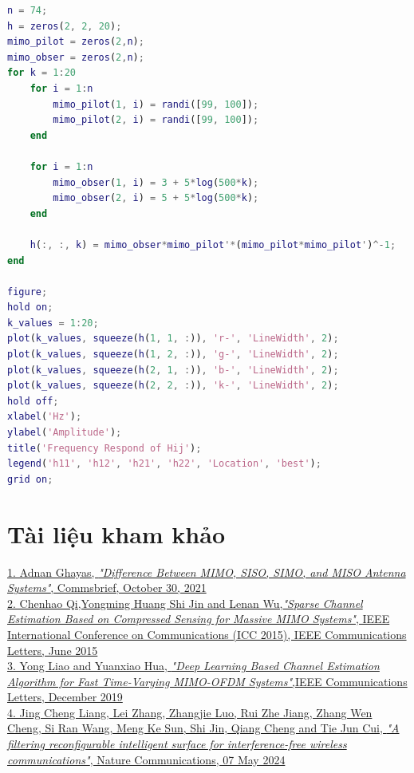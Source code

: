 \documentclass{article}
\begin{document}
\begin{lstlisting}[language=Matlab, caption=Kênh truyền đa ngõ vào đa ngõ ra]
n = 74;
h = zeros(2, 2, 20);
mimo_pilot = zeros(2,n);
mimo_obser = zeros(2,n);
for k = 1:20
    for i = 1:n
        mimo_pilot(1, i) = randi([99, 100]);  
        mimo_pilot(2, i) = randi([99, 100]);  
    end

    for i = 1:n
        mimo_obser(1, i) = 3 + 5*log(500*k);  
        mimo_obser(2, i) = 5 + 5*log(500*k); 
    end

    h(:, :, k) = mimo_obser*mimo_pilot'*(mimo_pilot*mimo_pilot')^-1;
end

figure; 
hold on; 
k_values = 1:20; 
plot(k_values, squeeze(h(1, 1, :)), 'r-', 'LineWidth', 2); 
plot(k_values, squeeze(h(1, 2, :)), 'g-', 'LineWidth', 2); 
plot(k_values, squeeze(h(2, 1, :)), 'b-', 'LineWidth', 2); 
plot(k_values, squeeze(h(2, 2, :)), 'k-', 'LineWidth', 2); 
hold off; 
xlabel('Hz');
ylabel('Amplitude');
title('Frequency Respond of Hij');
legend('h11', 'h12', 'h21', 'h22', 'Location', 'best');
grid on; 

\end{lstlisting}

\section{Tài liệu kham khảo}
\href{ https://commsbrief.com/difference-between-mimo-siso-simo-and-miso-antenna-systems/ }{1. Adnan Ghayas, \textit{"Difference Between MIMO, SISO, SIMO, and MISO Antenna Systems"}, Commsbrief, October 30, 2021} \\

\href{ https://www.researchgate.net/publication/297833789_Sparse_Channel_Estimation_Based_on_Compressed_Sensing_for_Massive_MIMO_Systems }{2. Chenhao Qi,Yongming Huang
Shi Jin and Lenan Wu,\textit{"Sparse Channel Estimation Based on Compressed Sensing for Massive MIMO Systems"}, IEEE International Conference on Communications (ICC 2015), IEEE Communications Letters, June 2015} \\

\href{ https://www.researchgate.net/publication/337969126_Deep_Learning_Based_Channel_Estimation_Algorithm_for_Fast_Time-Varying_MIMO-OFDM_Systems }{3. Yong Liao and Yuanxiao Hua, \textit{"Deep Learning Based Channel Estimation Algorithm for Fast Time-Varying MIMO-OFDM Systems"},IEEE Communications Letters, December 2019} \\

\href{ https://www.nature.com/articles/s41467-024-47865-6 }{4. Jing Cheng Liang, Lei Zhang, Zhangjie Luo, Rui Zhe Jiang, Zhang Wen Cheng, Si Ran Wang, Meng Ke Sun, Shi Jin, Qiang Cheng and Tie Jun Cui, \textit{"A filtering reconfigurable intelligent surface for interference-free wireless communications"}, Nature Communications, 07 May 2024} \\
\end{document}
